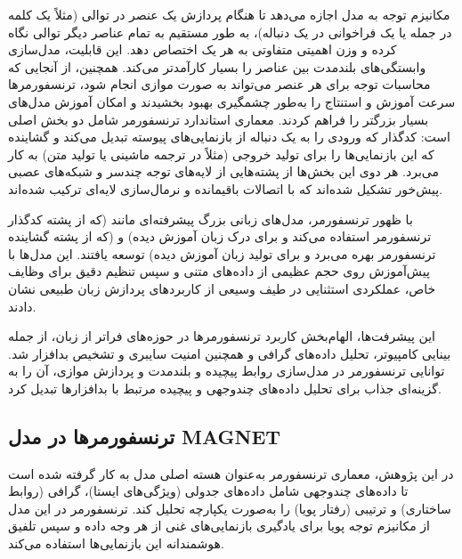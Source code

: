 مکانیزم توجه به مدل اجازه می‌دهد تا هنگام پردازش یک عنصر در توالی (مثلاً یک کلمه در جمله یا یک فراخوانی  در یک دنباله)، به طور مستقیم به تمام عناصر دیگر توالی نگاه کرده و وزن اهمیتی متفاوتی به هر یک اختصاص دهد. این قابلیت، مدل‌سازی وابستگی‌های بلندمدت بین عناصر را بسیار کارآمدتر می‌کند. همچنین، از آنجایی که محاسبات توجه برای هر عنصر می‌تواند به صورت موازی انجام شود، ترنسفورمرها سرعت آموزش و استنتاج را به‌طور چشمگیری بهبود بخشیدند و امکان آموزش مدل‌های بسیار بزرگتر را فراهم کردند. معماری استاندارد ترنسفورمر شامل دو بخش اصلی است: کدگذار  که ورودی را به یک دنباله از بازنمایی‌های پیوسته تبدیل می‌کند و گشاینده  که این بازنمایی‌ها را برای تولید خروجی (مثلاً در ترجمه ماشینی یا تولید متن) به کار می‌برد. هر دوی این بخش‌ها از پشته‌هایی از لایه‌های توجه چندسر و شبکه‌های عصبی پیش‌خور  تشکیل شده‌اند که با اتصالات باقیمانده  و نرمال‌سازی لایه‌ای  ترکیب شده‌اند.

با ظهور ترنسفورمر، مدل‌های زبانی بزرگ  پیشرفته‌ای مانند   (که از پشته کدگذار ترنسفورمر استفاده می‌کند و برای درک زبان آموزش دیده) و  (که از پشته گشاینده ترنسفورمر بهره می‌برد و برای تولید زبان آموزش دیده) توسعه یافتند. این مدل‌ها با پیش‌آموزش روی حجم عظیمی از داده‌های متنی و سپس تنظیم دقیق  برای وظایف خاص، عملکردی استثنایی در طیف وسیعی از کاربردهای پردازش زبان طبیعی نشان دادند.

این پیشرفت‌ها، الهام‌بخش کاربرد ترنسفورمرها در حوزه‌های فراتر از زبان، از جمله بینایی کامپیوتر، تحلیل داده‌های گرافی و همچنین امنیت سایبری و تشخیص بدافزار \cite{TransformerMalware} شد. توانایی ترنسفورمر در مدل‌سازی روابط پیچیده و بلندمدت و پردازش موازی، آن را به گزینه‌ای جذاب برای تحلیل داده‌های چندوجهی و پیچیده مرتبط با بدافزارها تبدیل کرد.

\subsection{ترنسفورمرها در مدل MAGNET}
در این پژوهش، معماری ترنسفورمر به‌عنوان هسته اصلی مدل   به کار گرفته شده است تا داده‌های چندوجهی شامل داده‌های جدولی (ویژگی‌های ایستا)، گرافی (روابط ساختاری) و ترتیبی (رفتار پویا) را به‌صورت یکپارچه تحلیل کند. ترنسفورمر در این مدل از مکانیزم توجه پویا برای یادگیری بازنمایی‌های غنی  از هر وجه داده و سپس تلفیق  هوشمندانه این بازنمایی‌ها استفاده می‌کند.

